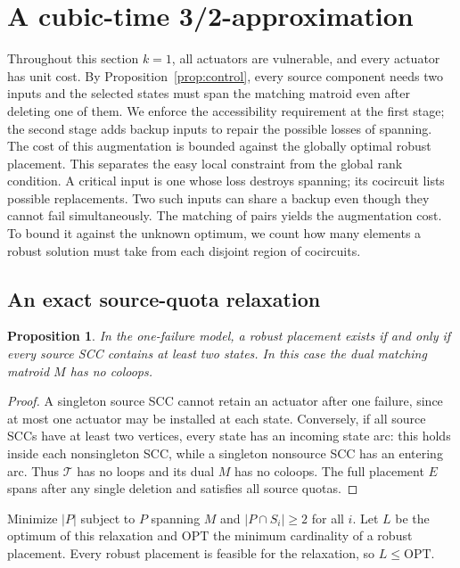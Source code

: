 \documentclass[11pt]{article}
\newtheorem{proposition}[theorem]{Proposition}
\theoremstyle{definition}
\theoremstyle{remark}\newtheorem{remark}[theorem]{Remark}
\newcommand{\OPT}{\mathrm{OPT}}
\begin{document}
\section{A cubic-time 3/2-approximation}\label{sec:approx}
Throughout this section $k=1$, all actuators are vulnerable, and
every actuator has unit cost.
By Proposition~\ref{prop:control}, every source component needs two
inputs and the selected states must span the matching matroid even
after deleting one of them. We enforce the accessibility requirement
at the first stage; the second stage adds backup inputs
to repair the possible losses of spanning. The cost of this
augmentation is bounded against the globally optimal robust
placement. This separates the easy local constraint from the
global rank condition. A critical input is one whose loss destroys
spanning; its cocircuit lists possible replacements. Two such inputs
can share a backup even though they cannot fail simultaneously.
The matching of pairs yields the augmentation cost. To bound it
against the unknown optimum, we count how many elements a robust
solution must take from each disjoint region of cocircuits.

\subsection{An exact source-quota relaxation}
\begin{proposition}\label{prop:one-failure-feasibility}
In the one-failure model, a robust placement exists if and only
if every source SCC contains at least two states. In this case the dual
matching matroid $M$ has no coloops.
\end{proposition}
\begin{proof}
A singleton source SCC cannot retain an actuator after one failure,
since at most one actuator may be installed at each state.
Conversely, if all source SCCs have at least two vertices, every state has
an incoming state arc: this holds inside each nonsingleton SCC, while
a singleton nonsource SCC has an entering arc. Thus $\mathcal T$ has no
loops and its dual $M$ has no coloops. The full placement $E$ spans
after any single deletion and satisfies all source quotas.
\end{proof}

Minimize $|P|$ subject to $P$ spanning $M$ and $|P\cap S_i|\ge2$ for
all $i$. Let $L$ be the optimum of this relaxation and $\OPT$ the minimum
cardinality of a robust placement. Every robust placement is feasible
for the relaxation, so $L\le\OPT$.
\end{document}
